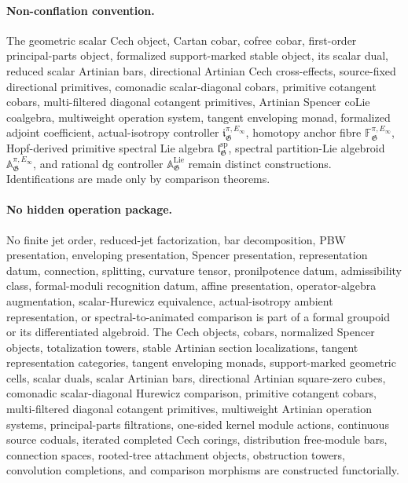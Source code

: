 \paragraph{Non-conflation convention.}
The geometric scalar Cech object, Cartan cobar, cofree cobar, first-order
principal-parts object, formalized support-marked stable object, its scalar
dual, reduced scalar Artinian bars, directional Artinian Cech cross-effects,
source-fixed directional primitives, comonadic scalar-diagonal cobars,
primitive cotangent cobars, multi-filtered diagonal cotangent primitives,
Artinian Spencer coLie coalgebra, multiweight operation system, tangent enveloping
monad, formalized adjoint coefficient, actual-isotropy controller
$\mathfrak i^{\pi,E_\infty}_{\mathfrak G}$, homotopy anchor fibre
$\mathbb F^{\pi,E_\infty}_{\mathfrak G}$, Hopf-derived primitive spectral Lie
algebra $\mathfrak l^{\mathrm{sp}}_{\mathfrak G}$, spectral partition-Lie
algebroid $\mathbb A^{\pi,E_\infty}_{\mathfrak G}$, and rational dg
controller $\mathbb A^{\mathrm{Lie}}_{\mathfrak G}$ remain distinct
constructions.  Identifications are made only by comparison theorems.

\paragraph{No hidden operation package.}
No finite jet order, reduced-jet factorization, bar decomposition, PBW
presentation, enveloping presentation, Spencer presentation, representation
datum, connection, splitting, curvature tensor, pronilpotence datum,
admissibility class, formal-moduli recognition datum, affine presentation,
operator-algebra augmentation, scalar-Hurewicz equivalence,
actual-isotropy ambient representation, or spectral-to-animated comparison is
part of a formal groupoid or its differentiated algebroid.  The Cech objects,
cobars, normalized Spencer objects, totalization towers, stable Artinian
section localizations, tangent representation categories, tangent enveloping
monads, support-marked geometric cells, scalar duals, scalar Artinian bars,
directional Artinian square-zero cubes, comonadic scalar-diagonal Hurewicz
comparison, primitive cotangent cobars, multi-filtered diagonal cotangent
primitives, multiweight Artinian operation systems,
principal-parts filtrations, one-sided kernel module actions, continuous
source coduals, iterated completed Cech corings, distribution free-module
bars, connection spaces, rooted-tree attachment objects, obstruction towers,
convolution completions, and comparison morphisms are constructed
functorially.

